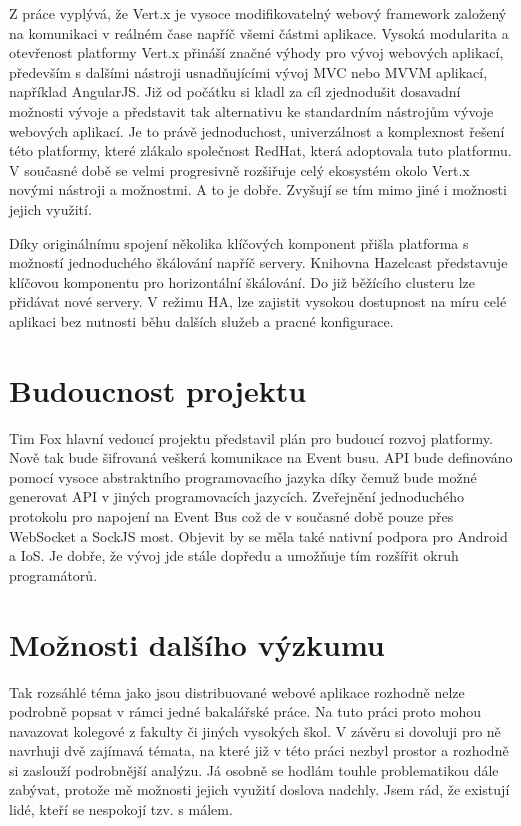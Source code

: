 Z práce vyplývá, že Vert.x je vysoce modifikovatelný webový framework založený na komunikaci v reálném čase napříč všemi částmi aplikace. Vysoká modularita a otevřenost platformy Vert.x přináší značné výhody pro vývoj webových aplikací, především s dalšími nástroji usnadňujícími vývoj MVC nebo MVVM aplikací, například AngularJS. Již od počátku si kladl za cíl zjednodušit dosavadní možnosti vývoje a představit tak alternativu ke standardním nástrojům vývoje webových aplikací. Je to právě jednoduchost, univerzálnost a komplexnost řešení této platformy, které zlákalo společnost RedHat, která adoptovala tuto platformu. V současné době se velmi progresivně rozšiřuje celý ekosystém okolo Vert.x novými nástroji a možnostmi. A to je dobře. Zvyšují se tím mimo jiné i možnosti jejich využití.

Díky originálnímu spojení několika klíčových komponent přišla platforma s možností jednoduchého škálování napříč servery. Knihovna Hazelcast představuje klíčovou komponentu pro horizontální škálování. Do již běžícího clusteru lze přidávat nové servery. V režimu HA, lze zajistit vysokou dostupnost na míru celé aplikaci bez nutnosti běhu dalších služeb a pracné konfigurace.

\section{Budoucnost projektu}

Tim Fox hlavní vedoucí projektu představil plán\cite{plan} pro budoucí rozvoj platformy. Nově tak bude šifrovaná veškerá komunikace na Event busu. API bude definováno pomocí vysoce abstraktního programovacího jazyka díky čemuž bude možné generovat API v jiných programovacích jazycích. Zveřejnění jednoduchého protokolu pro napojení na Event Bus což de v současné době pouze přes WebSocket a SockJS most. Objevit by se měla také nativní podpora pro Android a IoS. Je dobře, že vývoj jde stále dopředu a umožňuje tím rozšířit okruh programátorů.

\section{Možnosti dalšího výzkumu}

Tak rozsáhlé téma jako jsou distribuované webové aplikace rozhodně nelze podrobně popsat v rámci jedné bakalářské práce. Na tuto práci proto mohou navazovat kolegové z fakulty či jiných vysokých škol. V závěru si dovoluji pro ně navrhuji dvě zajímavá témata, na které již v této práci nezbyl prostor a rozhodně si zaslouží podrobnější analýzu. Já osobně se hodlám touhle problematikou dále zabývat, protože mě možnosti jejich využití doslova nadchly. Jsem rád, že existují lidé, kteří se nespokojí tzv. s málem.
 
